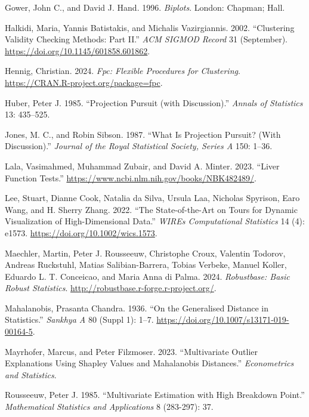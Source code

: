 \documentclass[
  12pt,
]{interact}
\newlength{\cslhangindent}
\newenvironment{CSLReferences}[2] %
 {\begin{list}{}{%
  \setlength{\itemindent}{0pt}
  \setlength{\leftmargin}{0pt}
  \setlength{\parsep}{0pt}
  \ifodd #1
   \setlength{\leftmargin}{\cslhangindent}
   \setlength{\itemindent}{-1\cslhangindent}
  \fi
  \setlength{\itemsep}{#2\baselineskip}}}
 {\end{list}}
\begin{document}
\begin{CSLReferences}{1}{0}
Gower, John C., and David J. Hand. 1996. \emph{Biplots}. London:
Chapman; Hall.

Halkidi, Maria, Yannis Batistakis, and Michalis Vazirgiannis. 2002.
{``Clustering Validity Checking Methods: Part II.''} \emph{ACM SIGMOD
Record} 31 (September). \url{https://doi.org/10.1145/601858.601862}.

Hennig, Christian. 2024. \emph{Fpc: Flexible Procedures for Clustering}.
\url{https://CRAN.R-project.org/package=fpc}.

Huber, Peter J. 1985. {``{P}rojection {P}ursuit (with Discussion).''}
\emph{Annals of Statistics} 13: 435--525.

Jones, M. C., and Robin Sibson. 1987. {``{W}hat Is {P}rojection
{P}ursuit? (With Discussion).''} \emph{Journal of the Royal Statistical
Society, Series A} 150: 1--36.

Lala, Vasimahmed, Muhammad Zubair, and David A. Minter. 2023. {``Liver
Function Tests.''} \url{https://www.ncbi.nlm.nih.gov/books/NBK482489/}.

Lee, Stuart, Dianne Cook, Natalia da Silva, Ursula Laa, Nicholas
Spyrison, Earo Wang, and H. Sherry Zhang. 2022. {``The State-of-the-Art
on Tours for Dynamic Visualization of High-Dimensional Data.''}
\emph{WIREs Computational Statistics} 14 (4): e1573.
\url{https://doi.org/10.1002/wics.1573}.

Maechler, Martin, Peter J. Rousseeuw, Christophe Croux, Valentin
Todorov, Andreas Ruckstuhl, Matias Salibian-Barrera, Tobias Verbeke,
Manuel Koller, Eduardo L. T. Conceicao, and Maria Anna di Palma. 2024.
\emph{Robustbase: Basic Robust Statistics}.
\url{http://robustbase.r-forge.r-project.org/}.

Mahalanobis, Prasanta Chandra. 1936. {``On the Generalised Distance in
Statistics.''} \emph{Sankhya A} 80 (Suppl 1): 1--7.
\url{https://doi.org/10.1007/s13171-019-00164-5}.

Mayrhofer, Marcus, and Peter Filzmoser. 2023. {``Multivariate Outlier
Explanations Using Shapley Values and Mahalanobis Distances.''}
\emph{Econometrics and Statistics}.

Rousseeuw, Peter J. 1985. {``Multivariate Estimation with High Breakdown
Point.''} \emph{Mathematical Statistics and Applications} 8 (283-297):
37.


\end{CSLReferences}
\end{document}
